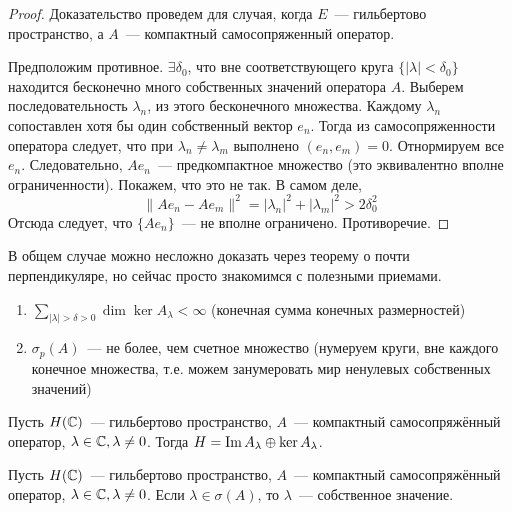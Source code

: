 \begin{proof}
    Доказательство проведем для случая, когда $E$~--- гильбертово пространство, а $A$~--- компактный самосопряженный оператор. 

    Предположим противное. $\exists \delta_0$, что вне соответствующего круга $\{|\lambda| < \delta_0\}$ находится бесконечно много собственных значений оператора $A$. Выберем последовательность $\lambda_n$, из этого бесконечного множества. 
    Каждому $\lambda_n$ сопоставлен хотя бы один собственный вектор $e_n$. Тогда из самосопряженности оператора следует, что при $\lambda_n \neq \lambda_m$ выполнено $(e_n, e_m) = 0$. Отнормируем все $e_n$. 
    Следовательно, $A e_n$~--- предкомпактное множество (это эквивалентно вполне ограниченности).
    Покажем, что это не так. В самом деле, 
    \[\|Ae_n - Ae_m\|^2 = |\lambda_n|^2 + |\lambda_m|^2 > 2 \delta_0^2\]
    Отсюда следует, что $\{A e_n\}$~--- не вполне ограничено. Противоречие.
\end{proof}

\begin{lemmanote}
    В общем случае можно несложно доказать через теорему о почти перпендикуляре, но сейчас просто знакомимся с полезными приемами.
\end{lemmanote}

\begin{corollary}[из теорем 12.2 и 12.3]
    \begin{enumerate}
        \item 
        \(
        \sum \limits_{|\lambda| > \delta > 0} \dim \ker A_{\lambda} < \infty
        \) (конечная сумма конечных размерностей)

        \item $\sigma_p(A)$~--- не более, чем счетное множество (нумеруем круги, вне каждого конечное множества, т.е. можем занумеровать мир ненулевых собственных значений)
    \end{enumerate}
\end{corollary}

\begin{theorem}[12.4 (Фредгольма)]
    Пусть $H(\mathbb{C})$~--- гильбертово пространство, $A$~--- компактный самосопряжённый оператор, $\lambda \in \mathbb{C}, \lambda \neq 0$. Тогда $H = \operatorname{Im} A_\lambda \oplus \ker A_\lambda$.
\end{theorem}

\begin{lemma}[1]\label{fredholm:lemma1}
    Пусть $H(\mathbb{C})$~--- гильбертово пространство, $A$~--- компактный самосопряжённый оператор, $\lambda \in \mathbb{C}, \lambda \neq 0$.
    Если $\lambda \in \sigma(A)$, то $\lambda$~--- собственное значение.
\end{lemma}

